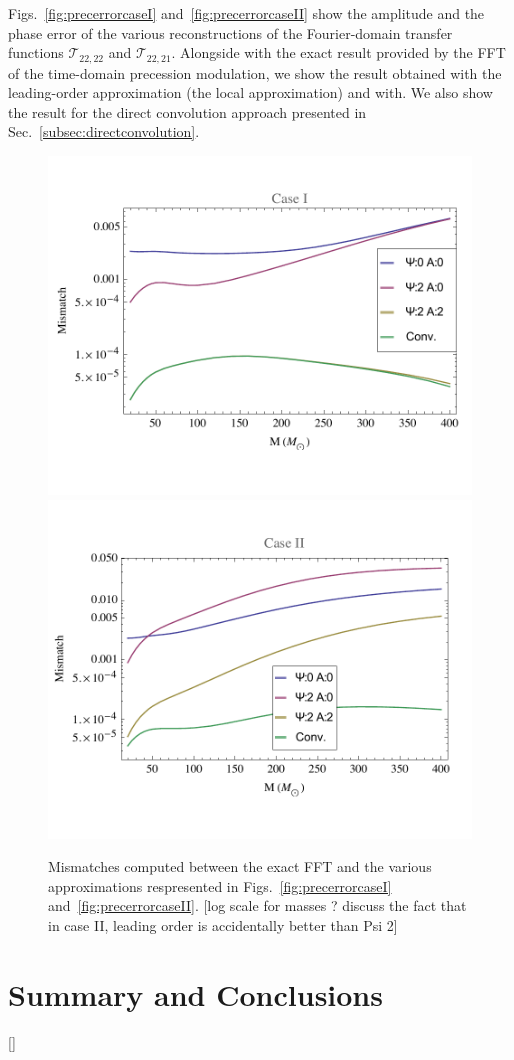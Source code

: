 \documentclass[aps,showpacs,%
prd,superscriptaddress,nofootinbib]{revtex4}
\newcommand\calT{{\mathcal{T}}}
\begin{document}
Figs.~\ref{fig:precerrorcaseI} and~\ref{fig:precerrorcaseII} show the amplitude and the phase error of the various reconstructions of the Fourier-domain transfer functions $\calT_{22,22}$ and $\calT_{22,21}$. Alongside with the exact result provided by the FFT of the time-domain precession modulation, we show the result obtained with the leading-order approximation (the local approximation) and with. We also show the result for the direct convolution approach presented in Sec.~\ref{subsec:directconvolution}.

\begin{figure}
  \centering
  \includegraphics[width=.48\linewidth]{plots/precmmsimple.pdf}
  \hspace{0.2cm}
  \includegraphics[width=.48\linewidth]{plots/precmmasympt.pdf}
  \caption{Mismatches computed between the exact FFT and the various approximations respresented in Figs.~\ref{fig:precerrorcaseI} and~\ref{fig:precerrorcaseII}. [log scale for masses ? discuss the fact that in case II, leading order is accidentally better than Psi 2]}
  \label{fig:precmm}
\end{figure}


\section{Summary and Conclusions}
\label{sec:discussion}

[]
\end{document}

